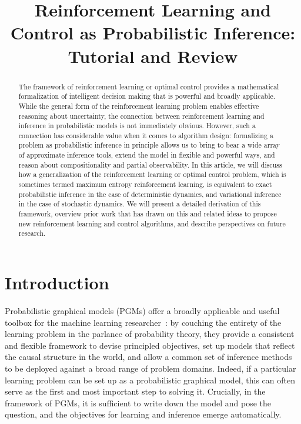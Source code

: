 \title{Reinforcement Learning and Control as Probabilistic Inference: Tutorial and Review}

\begin{abstract}
The framework of reinforcement learning or optimal control provides a mathematical formalization of intelligent decision making that is powerful and broadly applicable. While the general form of the reinforcement learning problem enables effective reasoning about uncertainty, the connection between reinforcement learning and inference in probabilistic models is not immediately obvious. However, such a connection has considerable value when it comes to algorithm design: formalizing a problem as probabilistic inference in principle allows us to bring to bear a wide array of approximate inference tools, extend the model in flexible and powerful ways, and reason about compositionality and partial observability. In this article, we will discuss how a generalization of the reinforcement learning or optimal control problem, which is sometimes termed maximum entropy reinforcement learning, is equivalent to exact probabilistic inference in the case of deterministic dynamics, and variational inference in the case of stochastic dynamics. We will present a detailed derivation of this framework, overview prior work that has drawn on this and related ideas to propose new reinforcement learning and control algorithms, and describe perspectives on future research.
\end{abstract}

\section{Introduction}

Probabilistic graphical models (PGMs) offer a broadly applicable and useful toolbox for the machine learning researcher~\citep{koller_friedman}: by couching the entirety of the learning problem in the parlance of probability theory, they provide a consistent and flexible framework to devise principled objectives, set up models that reflect the causal structure in the world, and allow a common set of inference methods to be deployed against a broad range of problem domains. Indeed, if a particular learning problem can be set up as a probabilistic graphical model, this can often serve as the first and most important step to solving it. Crucially, in the framework of PGMs, it is sufficient to write down the model and pose the question, and the objectives for learning and inference emerge automatically.

